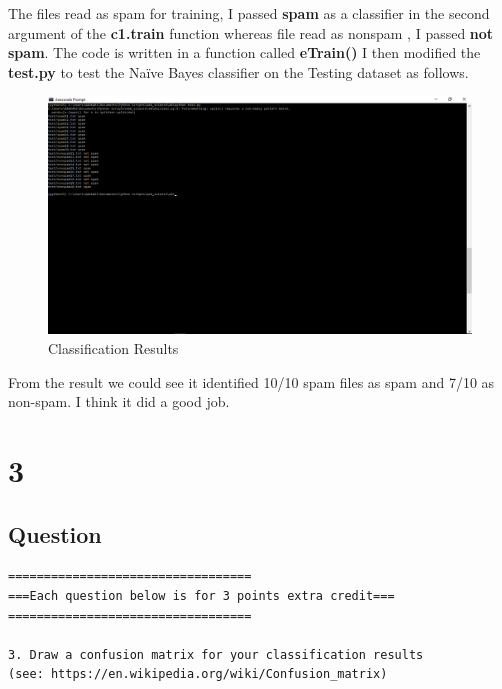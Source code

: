 \documentclass[letterpaper,11pt]{article}
\begin{document}
The files read as spam for training, I passed \textbf{spam} as a classifier in the second argument of the \textbf{c1.train} function whereas file read as nonspam , I passed \textbf{not spam}. The code is written in a function called \textbf{eTrain()}
I then modified the \textbf{test.py} to test the Naïve Bayes classifier on the Testing dataset as follows.




\begin{figure}[h]
\centering
\includegraphics[scale=0.33]{classification.png}
\caption{Classification Results }
\label{fig:q2naive}
\end{figure}

From the result we could see it identified 10/10 spam files as spam and 7/10 as non-spam. I think it did a  good job. 


\clearpage


\section*{3}

\subsection*{Question}

\begin{verbatim}
==================================
===Each question below is for 3 points extra credit===
==================================

3. Draw a confusion matrix for your classification results
(see: https://en.wikipedia.org/wiki/Confusion_matrix)

\end{verbatim}
\end{document}
